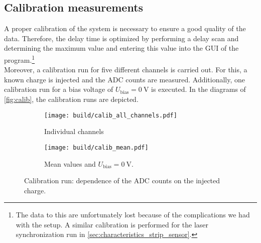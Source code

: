 \subsection{Calibration measurements}
\label{sec:analysis_calib}
A proper calibration of the system is necessary to ensure a good quality of the data. Therefore, the delay time is optimized by performing a delay scan and determining
the maximum value and entering this value into the GUI of the program.\footnote{The data to this are unfortunately lost because of the complications we had with the setup.
A similar calibration is performed for the laser synchronization run in \autoref{sec:characteristics_strip_sensor}.}\\
Moreover, a calibration run for five different channels is carried out. For this, a known charge is injected and the ADC counts are measured. Additionally, one
calibration run for a bias voltage of $U_{\mathrm{bias}}=\qty{0}{\volt}$ is executed. In the diagrams of \autoref{fig:calib}, the calibration runs are depicted.

\begin{figure}
    \centering
    \begin{subfigure}{0.6\textwidth}
        \texttt{[image: build/calib\_all\_channels.pdf]}
        \caption{Individual channels}
        \label{fig:calib_all_channels}
    \end{subfigure}
    \hfill
    \begin{subfigure}{0.6\textwidth}
        \texttt{[image: build/calib\_mean.pdf]}
        \caption{Mean values and $U_{\mathrm{bias}}=\qty{0}{\volt}$.}
        \label{fig:calib_mean}
    \end{subfigure}
    \caption{Calibration run: dependence of the ADC counts on the injected charge.}
    \label{fig:calib}
\end{figure}

